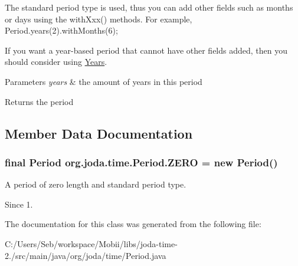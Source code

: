 The standard period type is used, thus you can add other fields such as months or days using the {\ttfamily with\-Xxx()} methods. For example, {\ttfamily Period.\-years(2).with\-Months(6);} 

If you want a year-\/based period that cannot have other fields added, then you should consider using \hyperlink{classorg_1_1joda_1_1time_1_1_years}{Years}.


\begin{DoxyParams}{Parameters}
{\em years} & the amount of years in this period \\
\hline
\end{DoxyParams}
\begin{DoxyReturn}{Returns}
the period 
\end{DoxyReturn}


\subsection{Member Data Documentation}
\hypertarget{classorg_1_1joda_1_1time_1_1_period_a92cbeef5e75f620641efa710b2bc59f5}{
\subsubsection[{Z\-E\-R\-O}]{\setlength{\rightskip}{0pt plus 5cm}final {\bf Period} org.\-joda.\-time.\-Period.\-Z\-E\-R\-O = new {\bf Period}()\hspace{0.3cm}{\ttfamily [static]}}}\label{classorg_1_1joda_1_1time_1_1_period_a92cbeef5e75f620641efa710b2bc59f5}
A period of zero length and standard period type. \begin{DoxySince}{Since}
1. 
\end{DoxySince}


The documentation for this class was generated from the following file\-:\begin{DoxyCompactItemize}
\item 
C\-:/\-Users/\-Seb/workspace/\-Mobii/libs/joda-\/time-\/2./src/main/java/org/joda/time/Period.\-java\end{DoxyCompactItemize}
